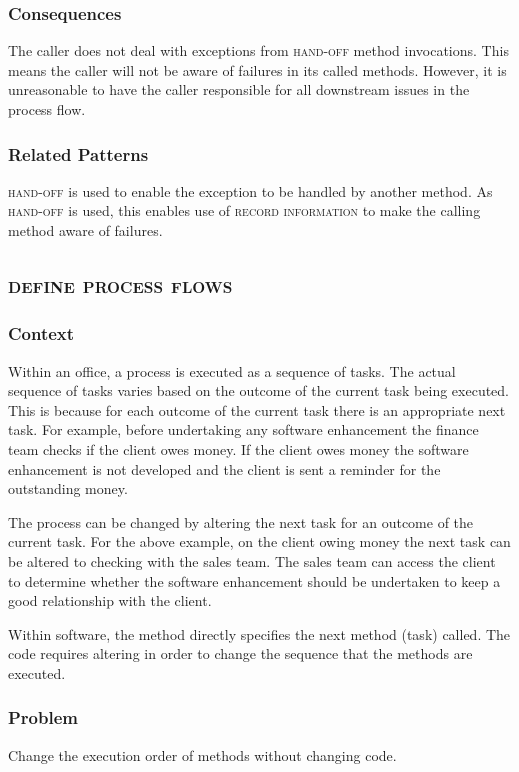 \documentclass[prodmode]{style/acmlarge}
\begin{document}
\subsubsection*{Consequences} The caller does not deal with exceptions from
\textsc{hand-off} method invocations.  This means the caller will not be
aware of failures in its called methods.  However, it is unreasonable to have
the caller responsible for all downstream issues in the process flow.

\subsubsection*{Related Patterns} \textsc{hand-off} is used to enable the
exception to be handled by another method.  As \textsc{hand-off} is used, this
enables use of \textsc{record information} to make the calling method aware of
failures.



\subsection{\textsc{\textbf{define process flows}}}

\subsubsection*{Context} Within an office, a process is executed as a sequence
of tasks.  The actual sequence of tasks varies based on the outcome of the
current task being executed.  This is because for each outcome of the current
task there is an appropriate next task.  For example, before undertaking any
software enhancement the finance team checks if the client owes money.  If the
client owes money the software enhancement is not developed and the client is
sent a reminder for the outstanding money.

The process can be changed by altering the next task for an outcome of the
current task.  For the above example, on the client owing money the next task
can be altered to checking with the sales team.  The sales team can access the
client to determine whether the software enhancement should be undertaken to
keep a good relationship with the client.

Within software, the method directly specifies the next method (task) called.
The code requires altering in order to change the sequence that the methods are
executed.

\subsubsection*{\textbf{Problem}} Change the execution order of methods without
changing code.
\end{document}
